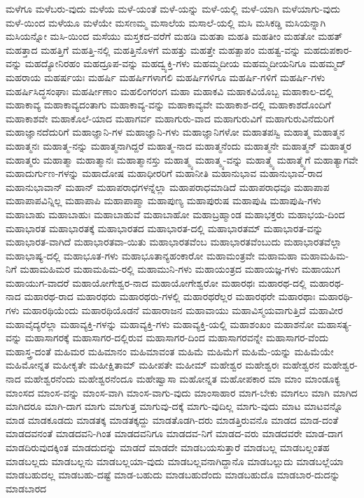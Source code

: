 {ಮಳೆಗೂ
ಮಳೆಬರು-ವುದು
ಮಳೆಯ
ಮಳೆ-ಯಂತೆ
ಮಳೆ-ಯನ್ನು
ಮಳೆ-ಯಲ್ಲಿ
ಮಳೆ-ಯಾಗಿ
ಮಳೆಯಾಗು-ವುದು
ಮಳೆ-ಯಿಂದ
ಮಳೆಯೂ
ಮಳೆಯೇ
ಮಸಣಮ್ಮ
ಮಸಾಲೆಯ
ಮಸಾಲೆ-ಯಲ್ಲಿ
ಮಸಿ
ಮಸಿಕಡ್ಡಿ
ಮಸಿಯನ್ನಾಗಿ
ಮಸಿಯನ್ನೋ
ಮಸಿ-ಯಿಂದ
ಮಸೆಯು
ಮಸ್ತಕದ-ವರೆಗೆ
ಮಹಡಿ
ಮಹತಾ
ಮಹತಿ
ಮಹತೀಂ
ಮಹತೋ
ಮಹತ್
ಮಹತ್ತಾದ
ಮಹತ್ತಿಗೆ
ಮಹತ್ತಿ-ನಲ್ಲಿ
ಮಹತ್ತಿನೊಳಗೆ
ಮಹತ್ತು
ಮಹತ್ತೇ
ಮಹತ್ಪಾಪಂ
ಮಹತ್ವ-ವನ್ನು
ಮಹದುಪಕಾರ-ವನ್ನು
ಮಹದ್ಯೋನಿರಹಂ
ಮಹದ್ರೂಪ-ವನ್ನು
ಮಹದ್ವ್ಯಕ್ತಿ-ಗಳು
ಮಹಮ್ಮದೀಯ
ಮಹಮ್ಮದೀಯನಿಗೂ
ಮಹಮ್ಮದ್
ಮಹರಾಯ
ಮಹರ್ಷಯಃ
ಮಹರ್ಷಿ
ಮಹರ್ಷಿಗಳಾಗಲಿ
ಮಹರ್ಷಿಗಳಿಗೂ
ಮಹರ್ಷಿ-ಗಳಿಗೆ
ಮಹರ್ಷಿ-ಗಳು
ಮಹರ್ಷಿಸಿದ್ಧಸಂಘಾಃ
ಮಹರ್ಷೀಣಾಂ
ಮಹಲಿಂಗರಂಗ
ಮಹಾ
ಮಹಾಕವಿ
ಮಹಾಕವಿಯೊಬ್ಬ
ಮಹಾಕಾಲ-ದಲ್ಲಿ
ಮಹಾಕಾವ್ಯ
ಮಹಾಕಾವ್ಯದಂತಾಗು
ಮಹಾಕಾವ್ಯ-ವನ್ನು
ಮಹಾಕಾವ್ಯವೇ
ಮಹಾಕಾಶ-ದಲ್ಲಿ
ಮಹಾಕಾಶದೊಂದಿಗೆ
ಮಹಾಕಾಶವೇ
ಮಹಾಕೊಲೆ-ಯಾದ
ಮಹಾಗರ್ವ
ಮಹಾಗುರು-ವಾದ
ಮಹಾಗುರುವಿಗೆ
ಮಹಾಗುರುವಿನೆದುರಿಗೆ
ಮಹಾಜ್ಞಾನದೆದುರಿಗೆ
ಮಹಾಜ್ಞಾನಿ-ಗಳ
ಮಹಾಜ್ಞಾನಿ-ಗಳು
ಮಹಾಜ್ಞಾನಿಗಳೋ
ಮಹಾತಪಸ್ವಿ
ಮಹಾತ್ಮ
ಮಹಾತ್ಮನ
ಮಹಾತ್ಮನಃ
ಮಹಾತ್ಮ-ನನ್ನು
ಮಹಾತ್ಮನಾಗಿದ್ದರೆ
ಮಹಾತ್ಮ-ನಾದ
ಮಹಾತ್ಮನೆಂದು
ಮಹಾತ್ಮನೇ
ಮಹಾತ್ಮನ್
ಮಹಾತ್ಮರ
ಮಹಾತ್ಮರು
ಮಹಾತ್ಮಾ
ಮಹಾತ್ಮಾನಃ
ಮಹಾತ್ಮಾನಸ್ತು
ಮಹಾತ್ಮ್ಯ
ಮಹಾತ್ಮ್ಯ-ವನ್ನು
ಮಹಾತ್ಮ್ಯೆ
ಮಹಾತ್ಮ್ಯೆಗೆ
ಮಹಾತ್ಯಾಗವೇ
ಮಹಾದುರ್ಗುಣ-ಗಳನ್ನು
ಮಹಾದೋಷ
ಮಹಾಧೀರರಿಗೆ
ಮಹಾನೀತಿ
ಮಹಾನುಭಾವ
ಮಹಾನುಭಾವ-ರಾದ
ಮಹಾನುಭಾವಾನ್
ಮಹಾನ್
ಮಹಾಪರಾಧಗಳನ್ನೆಲ್ಲಾ
ಮಹಾಪರಾಧಮಾಡಿದೆ
ಮಹಾಪರಾಧವೂ
ಮಹಾಪಾಪ
ಮಹಾಪಾಪವಿನ್ನಿಲ್ಲ
ಮಹಾಪಾಪಿ
ಮಹಾಪಾಪ್ಮಾ
ಮಹಾಪುಣ್ಯ
ಮಹಾಪುರುಷ
ಮಹಾಪುಷಿ
ಮಹಾಪುಷಿ-ಗಳು
ಮಹಾಬಾಹು
ಮಹಾಬಾಹುಃ
ಮಹಾಬಾಹುವೆ
ಮಹಾಬಾಹೋ
ಮಹಾಬ್ರಹ್ಮಾಂಡ
ಮಹಾಭಕ್ತರು
ಮಹಾಭಯ-ದಿಂದ
ಮಹಾಭಾರತ
ಮಹಾಭಾರತಕ್ಕೆ
ಮಹಾಭಾರತದ
ಮಹಾಭಾರತ-ದಲ್ಲಿ
ಮಹಾಭಾರತಮ್
ಮಹಾಭಾರತ-ವನ್ನು
ಮಹಾಭಾರತ-ವಾಗಿದೆ
ಮಹಾಭಾರತವಾ-ಯಿತು
ಮಹಾಭಾರತವೆಂಬ
ಮಹಾಭಾರತವೆಂಬುದು
ಮಹಾಭಾರತವೆಲ್ಲಾ
ಮಹಾಭಾಷ್ಯ-ದಲ್ಲಿ
ಮಹಾಭೂತ-ಗಳು
ಮಹಾಭೂತಾನ್ಯಹಂಕಾರೋ
ಮಹಾಮಂತ್ರವೇ
ಮಹಾಮಹಾ
ಮಹಾಮಹಿಮ-ನಿಗೆ
ಮಹಾಮಹಿಮರ
ಮಹಾಮಹಿಮ-ರಲ್ಲಿ
ಮಹಾಮುನಿ-ಗಳು
ಮಹಾಯಂತ್ರದ
ಮಹಾಯಜ್ಞ-ಗಳು
ಮಹಾಯುಗ
ಮಹಾಯುಗ-ವಾದರೆ
ಮಹಾಯೋಗೇಶ್ವರ-ನಾದ
ಮಹಾಯೋಗೇಶ್ವರೋ
ಮಹಾರಥಃ
ಮಹಾರಥ-ದಲ್ಲಿ
ಮಹಾರಥ-ನಾದ
ಮಹಾರಥ-ರಾದ
ಮಹಾರಥರು
ಮಹಾರಥರು-ಗಳಲ್ಲಿ
ಮಹಾರಥರೆಲ್ಲರ
ಮಹಾರಥರೇ
ಮಹಾರಥಾಃ
ಮಹಾರಥಿ-ಗಳು
ಮಹಾರಥಿಯೆಂದು
ಮಹಾರಥಿಯೊಡನೆ
ಮಹಾರಾಜನ
ಮಹಾವಾಯು
ಮಹಾವಿಸ್ಮಯವಾಗುತ್ತಿದೆ
ಮಹಾವೀರ
ಮಹಾವೈದ್ಯರೆಲ್ಲಾ
ಮಹಾವ್ಯಕ್ತಿ-ಗಳನ್ನು
ಮಹಾವ್ಯಕ್ತಿ-ಗಳು
ಮಹಾವ್ಯಕ್ತಿ-ಯಲ್ಲಿ
ಮಹಾಶಂಖಂ
ಮಹಾಶನೋ
ಮಹಾಸತ್ಯ-ವನ್ನು
ಮಹಾಸಾಗರಕ್ಕೆ
ಮಹಾಸಾಗರ-ದಲ್ಲಿರುವ
ಮಹಾಸಾಗರ-ದಿಂದ
ಮಹಾಸಾಗರವನ್ನೇ
ಮಹಾಸಾಗರ-ವೆಂದು
ಮಹಾಸ್ತ್ರ-ದಂತೆ
ಮಹಿಮರ
ಮಹಿಮಾನಂ
ಮಹಿಮಾವಂತ
ಮಹಿಮೆ
ಮಹಿಮೆಗೆ
ಮಹಿಮೆ-ಯನ್ನು
ಮಹಿಮೆಯೇ
ಮಹಿಮೋನ್ನತ
ಮಹೀಕೃತೇ
ಮಹೀಕ್ಷಿತಾಮ್
ಮಹೀಪತೇ
ಮಹೀಮ್
ಮಹೇಶ್ವರ
ಮಹೇಶ್ವರಃ
ಮಹೇಶ್ವರನ
ಮಹೇಶ್ವರ-ನಾದ
ಮಹೇಶ್ವರನೆಂದು
ಮಹೇಶ್ವರನೆಂದೂ
ಮಹೇಷ್ವಾಸಾ
ಮಹೋನ್ನತ
ಮಹೋಪಕಾರ
ಮಾ
ಮಾಂ
ಮಾಂಡೂಕ್ಯ
ಮಾಂಸದ
ಮಾಂಸ-ವನ್ನು
ಮಾಂಸ-ವಾಗಿ
ಮಾಂಸ-ವಾಗು-ವುದು
ಮಾಂಸಾಹಾರ
ಮಾಗ-ಬೇಕು
ಮಾಗಲು
ಮಾಗಿ
ಮಾಗಿದ
ಮಾಗಿದರೂ
ಮಾಗಿ-ದಾಗ
ಮಾಗು
ಮಾಗುತ್ತ
ಮಾಗುವು-ದಕ್ಕೆ
ಮಾಗು-ವುದಿಲ್ಲ
ಮಾಗು-ವುದು
ಮಾಟ
ಮಾಟವನ್ನೊ
ಮಾಡ
ಮಾಡಕೂಡದು
ಮಾಡತಕ್ಕ
ಮಾಡತಕ್ಕದ್ದು
ಮಾಡತೊಡಗಿ-ದರು
ಮಾಡತ್ತಿರುವನೊ
ಮಾಡದ
ಮಾಡ-ದಂತೆ
ಮಾಡದವನಂತೆ
ಮಾಡದವನಿ-ಗಿಂತ
ಮಾಡದವನಿಗೂ
ಮಾಡದವ-ನಿಗೆ
ಮಾಡದ-ವರು
ಮಾಡದವರೇ
ಮಾಡ-ದಾಗ
ಮಾಡದಿರುವುದಕ್ಕಿಂತ
ಮಾಡದುದನ್ನು
ಮಾಡದೆ
ಮಾಡದೇ
ಮಾಡಬಯಸುತ್ತಾರೆ
ಮಾಡಬಲ್ಲ
ಮಾಡಬಲ್ಲಂತಹ
ಮಾಡಬಲ್ಲದು
ಮಾಡಬಲ್ಲನು
ಮಾಡಬಲ್ಲಯಾ-ವುದು
ಮಾಡಬಲ್ಲವನಾಗಿದ್ದಾನೊ
ಮಾಡಬಲ್ಲುದು
ಮಾಡಬಲ್ಲೆಯಾ
ಮಾಡಬಹುದಲ್ಲ
ಮಾಡಬಹು-ದಷ್ಟೆ
ಮಾಡ-ಬಹುದು
ಮಾಡಬಹುದೆಂದು
ಮಾಡಬಹುದೊ
ಮಾಡಬಾರ-ದುದನ್ನು
ಮಾಡಬಾರದ
}
